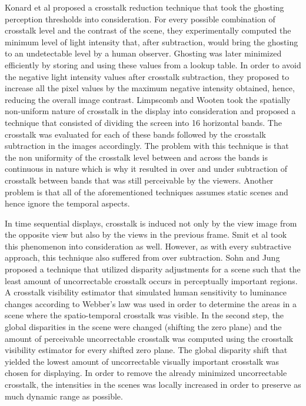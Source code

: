  Konard et al \cite{konrad2000cancellation} proposed a crosstalk reduction technique that took the ghosting perception thresholds into consideration. For every possible combination of crosstalk level and the contrast of the scene, they experimentally computed the minimum level of light intensity that, after subtraction, would bring the ghosting to an undetectable level by a human observer. Ghosting was later minimized efficiently by storing and using these values from a lookup table. In order to avoid the negative light intensity values after crosstalk subtraction, they proposed to increase all the pixel values by the maximum negative intensity obtained, hence, reducing the overall image contrast. Limpscomb and Wooten \cite{lipscomb1994reducing} took the spatially non-uniform nature of crosstalk in the display into consideration and proposed a technique that consisted of dividing the screen into 16 horizontal bands. The crosstalk was evaluated for each of these bands followed by the crosstalk subtraction in the images accordingly. The problem with this technique is that the non uniformity of the crosstalk level between and across the bands is continuous in nature which is why it resulted in over and under subtraction of crosstalk between bands that was still perceivable by the viewers. Another problem is that all of the aforementioned techniques assumes static scenes and hence ignore the temporal aspects.

 In time sequential displays, crosstalk is induced not only by the view image from the opposite view but also by the views in the previous frame. Smit et al \cite{smit2007non} took this phenomenon into consideration as well. However, as with every subtractive approach, this technique also suffered from over subtraction. Sohn and Jung \cite{sohn2014crosstalk} proposed a technique that utilized disparity adjustments for a scene such that the least amount of uncorrectable crosstalk occurs in perceptually important regions. A crosstalk visibility estimator that simulated human sensitivity to luminance changes according to Webber's law was used in order to determine the areas in a scene where the spatio-temporal crosstalk was visible. In the second step, the global disparities in the scene were changed (shifting the zero plane) and the amount of perceivable uncorrectable crosstalk was computed using the crosstalk visibility estimator for every shifted zero plane. The global disparity shift that yielded the lowest amount of uncorrectable visually important crosstalk was chosen for displaying. In order to remove the already minimized uncorrectable crosstalk, the intensities in the scenes was locally increased in order to preserve as much dynamic range as possible.

